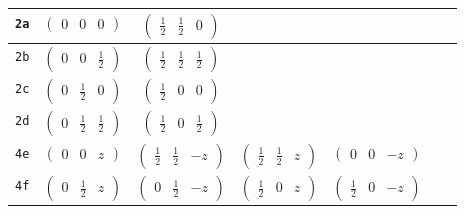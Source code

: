 \documentclass[fleqn,9pt,landscape]{jsarticle}
\begin{document}
\begin{center}
\begin{longtable}{ccccccc}
{\tt 2a} & $ \begin{pmatrix} 0 & 0 & 0 \end{pmatrix} $ & $ \begin{pmatrix} \frac{1}{2} & \frac{1}{2} & 0 \end{pmatrix} $ & $  $ & $  $ & $  $ & $  $ \\ \hline
{\tt 2b} & $ \begin{pmatrix} 0 & 0 & \frac{1}{2} \end{pmatrix} $ & $ \begin{pmatrix} \frac{1}{2} & \frac{1}{2} & \frac{1}{2} \end{pmatrix} $ & $  $ & $  $ & $  $ & $  $ \\ \hline
{\tt 2c} & $ \begin{pmatrix} 0 & \frac{1}{2} & 0 \end{pmatrix} $ & $ \begin{pmatrix} \frac{1}{2} & 0 & 0 \end{pmatrix} $ & $  $ & $  $ & $  $ & $  $ \\ \hline
{\tt 2d} & $ \begin{pmatrix} 0 & \frac{1}{2} & \frac{1}{2} \end{pmatrix} $ & $ \begin{pmatrix} \frac{1}{2} & 0 & \frac{1}{2} \end{pmatrix} $ & $  $ & $  $ & $  $ & $  $ \\ \hline
{\tt 4e} & $ \begin{pmatrix} 0 & 0 & z \end{pmatrix} $ & $ \begin{pmatrix} \frac{1}{2} & \frac{1}{2} & - z \end{pmatrix} $ & $ \begin{pmatrix} \frac{1}{2} & \frac{1}{2} & z \end{pmatrix} $ & $ \begin{pmatrix} 0 & 0 & - z \end{pmatrix} $ & $  $ & $  $ \\ \hline
{\tt 4f} & $ \begin{pmatrix} 0 & \frac{1}{2} & z \end{pmatrix} $ & $ \begin{pmatrix} 0 & \frac{1}{2} & - z \end{pmatrix} $ & $ \begin{pmatrix} \frac{1}{2} & 0 & z \end{pmatrix} $ & $ \begin{pmatrix} \frac{1}{2} & 0 & - z \end{pmatrix} $ & $  $ & $  $ \\ \hline

\end{longtable}
\end{center}
\end{document}
